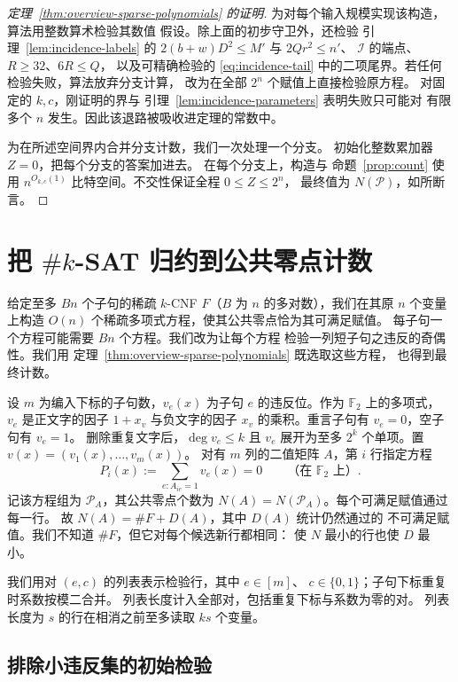 \documentclass[11pt,reqno]{amsart}
\numberwithin{equation}{section}
\theoremstyle{definition}\newtheorem{definition}[theorem]{定义}
\theoremstyle{remark}\newtheorem{remark}[theorem]{注}
\renewcommand{\le}{\leqslant}
\renewcommand{\ge}{\geqslant}
\begin{document}
\begin{proof}[定理~\ref{thm:overview-sparse-polynomials} 的证明]
为对每个输入规模实现该构造，算法用整数算术检验其数值
假设。除上面的初步守卫外，还检验
引理~\ref{lem:incidence-labels} 的
$2(b+w)D^2\le M'$ 与 $2Qr^2\le n'$、
$\mathcal I$ 的端点、$R\ge32$、$6R\le Q$，
以及可精确检验的 \eqref{eq:incidence-tail}
中的二项尾界。若任何检验失败，算法放弃分支计算，
改为在全部 $2^n$ 个赋值上直接检验原方程。
对固定的 $k,c$，刚证明的界与
引理~\ref{lem:incidence-parameters} 表明失败只可能对
有限多个 $n$ 发生。因此该退路被吸收进定理的常数中。

为在所述空间界内合并分支计数，我们一次处理一个分支。
初始化整数累加器 $Z=0$，把每个分支的答案加进去。
在每个分支上，构造与
命题~\ref{prop:count} 使用 $n^{O_{k,c}(1)}$
比特空间。不交性保证全程 $0\le Z\le2^n$，
最终值为 $N(\mathcal P)$，如所断言。
\end{proof}
\section{把 \texorpdfstring{$\#k$-SAT}{\#k-SAT} 归约到公共零点计数}\label{sec:hashes}\label{subsec:sparse-hashes}
给定至多 $Bn$ 个子句的稀疏 $k$-CNF $F$（$B$ 为 $n$
的多对数），我们在其原 $n$ 个变量上构造 $O(n)$
个稀疏多项式方程，使其公共零点恰为其可满足赋值。
每子句一个方程可能需要 $Bn$ 个方程。我们改为让每个方程
检验一列短子句之违反的奇偶性。我们用
定理~\ref{thm:overview-sparse-polynomials} 既选取这些方程，
也得到最终计数。

设 $m$ 为编入下标的子句数，$v_e(x)$ 为子句 $e$
的违反位。作为 $\mathbb F_2$ 上的多项式，
$v_e$ 是正文字的因子 $1+x_v$ 与负文字的因子 $x_v$
的乘积。重言子句有 $v_e=0$，空子句有 $v_e=1$。
删除重复文字后，$\deg v_e\le k$ 且 $v_e$
展开为至多 $2^k$ 个单项。置 $v(x)=(v_1(x),\ldots,v_m(x))$。
对有 $m$ 列的二值矩阵 $A$，第 $i$ 行指定方程
\begin{equation}\label{eq:hash-query}
 P_i(x):=\sum_{e:A_{ie}=1} v_e(x)=0\qquad\text{（在 }\mathbb F_2\text{ 上）}.
\end{equation}
记该方程组为 $\mathcal P_A$，其公共零点个数为
$N(A)=N(\mathcal P_A)$。每个可满足赋值通过每一行。
故 $N(A)=\#F+D(A)$，其中 $D(A)$ 统计仍然通过的
不可满足赋值。我们不知道 $\#F$，但它对每个候选新行都相同：
使 $N$ 最小的行也使 $D$ 最小。

我们用对 $(e,c)$ 的列表表示检验行，其中 $e\in[m]$、
$c\in\{0,1\}$；子句下标重复时系数按模二合并。
列表长度计入全部对，包括重复下标与系数为零的对。
列表长度为 $s$ 的行在相消之前至多读取 $ks$ 个变量。

\subsection{排除小违反集的初始检验}
\end{document}
